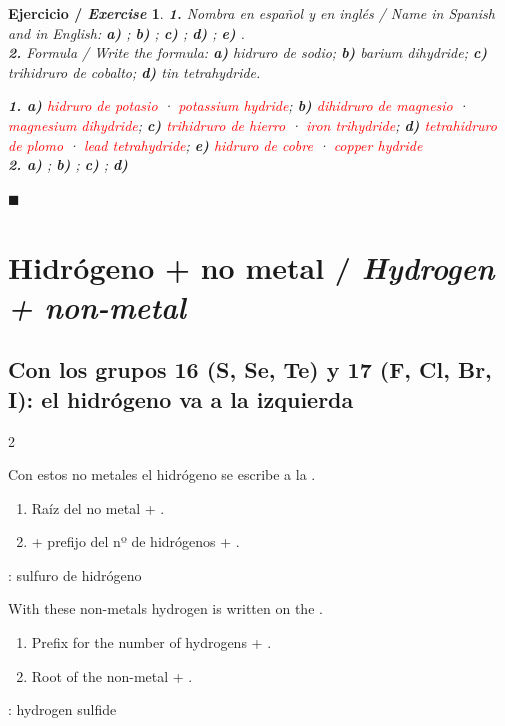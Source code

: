 \documentclass[12pt]{article}
\theoremstyle{mygreennumbox}
\newtheorem{ejercicioT}{Ejercicio / \textit{Exercise}}[section]
\newenvironment{exercise}{\begin{eBoxmygreen}\begin{ejercicioT}}{\hfill{\color{mygreen}\tiny\ensuremath{\blacksquare}}\end{ejercicioT}\end{eBoxmygreen}}
\newcommand{\en}[1]{\textit{#1}}
\newcommand{\cabcol}[1]{\raggedright\noindent{\sffamily\bfseries\color{myOrange3}#1}\par\smallskip}
\newenvironment{reglas}{%
    \par\medskip\setlength{\columnseprule}{0.4pt}%
    \begin{paracol}{2}\cabcol{Español}%
}{%
    \end{paracol}\medskip%
}
\newcommand{\ingles}{\switchcolumn\cabcol{English}}
\begin{document}
\begin{exercise}
    \textbf{1.} Nombra en español y en inglés / \en{Name in Spanish and in English}: \textbf{a)} ; \textbf{b)} ; \textbf{c)} ; \textbf{d)} ; \textbf{e)} .\\
    \textbf{2.} Formula / \en{Write the formula}: \textbf{a)} hidruro de sodio; \textbf{b)} \en{barium dihydride}; \textbf{c)} trihidruro de cobalto; \textbf{d)} \en{tin tetrahydride}.
    \begin{solu}
        \textbf{1. a)} \textcolor{red}{hidruro de potasio} · \textcolor{red}{\en{potassium hydride}}; \textbf{b)} \textcolor{red}{dihidruro de magnesio} · \textcolor{red}{\en{magnesium dihydride}}; \textbf{c)} \textcolor{red}{trihidruro de hierro} · \textcolor{red}{\en{iron trihydride}}; \textbf{d)} \textcolor{red}{tetrahidruro de plomo} · \textcolor{red}{\en{lead tetrahydride}}; \textbf{e)} \textcolor{red}{hidruro de cobre} · \textcolor{red}{\en{copper hydride}}\\
        \textbf{2. a)} \textcolor{red}{}; \textbf{b)} \textcolor{red}{}; \textbf{c)} \textcolor{red}{}; \textbf{d)} \textcolor{red}{}
    \end{solu}
\end{exercise}

\section{Hidrógeno + no metal / \en{Hydrogen + non-metal}}

\subsection{Con los grupos 16 (S, Se, Te) y 17 (F, Cl, Br, I): el hidrógeno va a la izquierda}

\begin{reglas}
    Con estos no metales el hidrógeno se escribe a la .
    \begin{enumerate}[label=\numberballgreen]
        \item Raíz del no metal + .
        \item {} + prefijo del nº de hidrógenos + .
    \end{enumerate}
    : sulfuro de hidrógeno
    \ingles
    With these non-metals hydrogen is written on the .
    \begin{enumerate}[label=\numberballgreen]
        \item Prefix for the number of hydrogens + .
        \item Root of the non-metal + .
    \end{enumerate}
    : hydrogen sulfide
\end{reglas}
\end{document}
